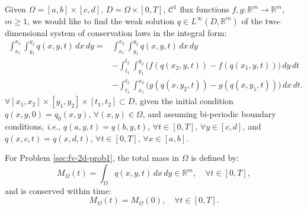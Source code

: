\begin{prob}
	\label{sec:fv-2d-prob1}
	Given $\Omega = [a,b]\times [c,d]$, $D = \Omega \times [0,T]$, 
	$\mathcal{C}^1$ flux functions ${f},
	{g}: \mathbb{R}^m \to \mathbb{R}^m$,
	$m \geq 1$, we would like to find the weak solution
	$ {q} \in L^{\infty}(D, \mathbb{R}^m)$ 
	of the two-dimensional system of conservation laws in the integral form:
	\begin{align*}
		\int_{x_1}^{x_2} \int_{y_1}^{y_2}
		{q}(x, y, t) \,dx \,dy = &\int_{x_1}^{x_2} \int_{y_1}^{y_2}
		{q}(x, y, t) \,dx \,dy \\ \nonumber
		&-\int_{t_1}^{t_2} \int_{y_1}^{y_2} \bigg({f}({q}(x_2, y, t))
		-{f}({q}(x_1, y, t)) \bigg) \,dy \,dt\\ \nonumber
		&-\int_{t_1}^{t_2} \int_{x_1}^{x_2} \bigg({g}({q}(x, y_2, t))
		-{g}({q}(x, y_1, t)) \bigg) \,dx \,dt.
	\end{align*}
	$\forall [x_1, x_2]\times [y_1, y_2] \times[t_1, t_2] \subset D$, 
	given the initial condition 
	${q}(x, y, 0) = {q}_0(x, y)$, $\forall (x, y) \in \Omega$, 
	and assuming bi-periodic boundary conditions, \textit{i.e.}, 
	${q}(a,y,t) = {q}(b,y,t)$, $\forall t \in [0,T]$, $\forall y \in [c,d]$, and
	${q}(x,c,t) = {q}(x,d,t)$, $\forall t \in [0,T]$, $\forall x \in [a,b]$.
\end{prob}

For Problem \ref{sec:fv-2d-prob1}, the total mass in $\Omega$ is defined by: 
\begin{equation}
	{M}_{\Omega}(t) = \int_{\Omega} {q}(x,y,t) \,dx \,dy  \in \mathbb{R}^m, \quad \forall t \in [0,T],
\end{equation}
and is conserved within time: 
\begin{equation}
	{M}_{\Omega}(t) = {M}_{\Omega}(0), \quad \forall t \in [0,T].
\end{equation}

